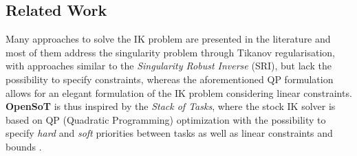 

\subsection{Related Work}
\label{sec:related_work_opensot}
Many approaches to solve the IK problem are presented in the literature and most of them address the singularity problem through Tikanov regularisation, with approaches similar to the \emph{Singularity Robust Inverse} (SRI), but lack the possibility to specify constraints, whereas the aforementioned QP formulation allows for an elegant formulation of the IK problem considering linear constraints.
\textbf{OpenSoT} is thus inspired by the \emph{Stack of Tasks}, where the stock IK solver is based on QP (Quadratic Programming) optimization with the possibility to specify \emph{hard} \cite{kanoun2009prioritizing} and \emph{soft} \cite{chiacchio1991closed} priorities between tasks as well as linear constraints and bounds \cite{escande2014hierarchical}.

